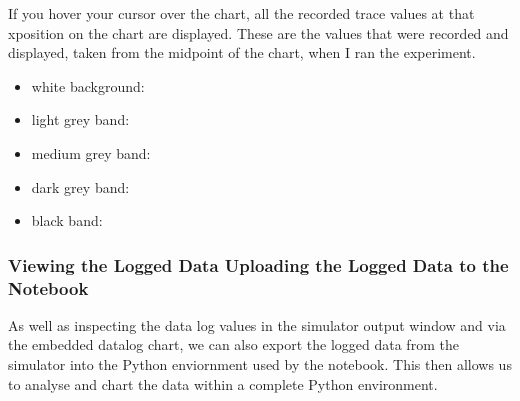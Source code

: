 \documentclass[letterpaper,10pt,english]{sphinxmanual}
\begin{document}
If you hover your cursor over the chart, all the recorded trace values at that x\sphinxhyphen{}position on the chart are displayed. These are the values that were recorded and displayed, taken from the midpoint of the chart, when I ran the experiment.
\begin{itemize}
\item {} 
white background: 

\item {} 
light grey band: 

\item {} 
medium grey band: 

\item {} 
dark grey band: 

\item {} 
black band: 

\end{itemize}





\subsubsection{Viewing the Logged Data \sphinxhyphen{} Uploading the Logged Data to the Notebook}
\label{\detokenize{content/00_SOFTWARE_GUIDE/Section_00_03_quick_practical_tour:Viewing-the-Logged-Data---Uploading-the-Logged-Data-to-the-Notebook}}
As well as inspecting the data log values in the simulator output window and via the embedded datalog chart, we can also export the logged data from the simulator into the Python enviornment used by the notebook. This then allows us to analyse and chart the data within a complete Python environment.
\end{document}
